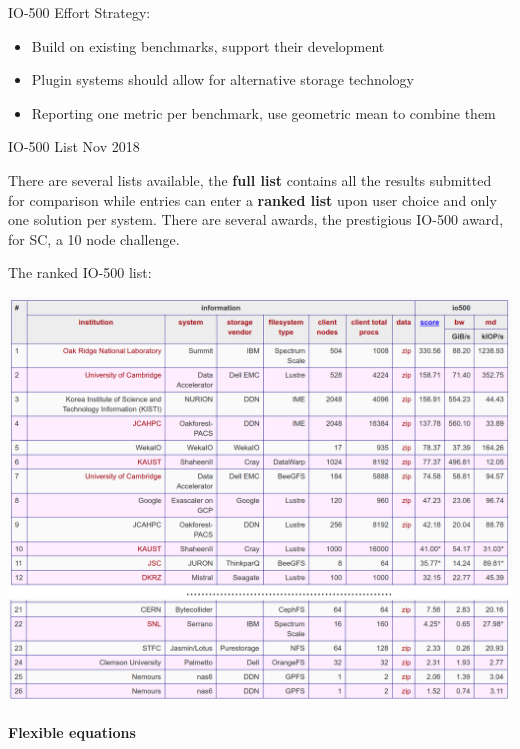 \documentclass[portrait,a0paper,fontscale=0.4]{baposter}
\begin{document}
\begin{poster}
\begin{posterbox}[name=io500,column=1,span=2]{IO-500 Effort}
Strategy:
\vspace*{-1em}
\begin{itemize}
\item Build on existing benchmarks, support their development
\item Plugin systems should allow for alternative storage technology
\item Reporting one metric per benchmark, use geometric mean to combine them
\end{itemize}


\end{posterbox}


\begin{posterbox}[name=io500res,column=1,above=bottom,below=io500]{IO-500 List Nov 2018}

There are several lists available, the \textbf{full list} contains all the results submitted for comparison while entries can enter a \textbf{ranked list} upon user choice and only one solution per system.
There are several awards, the prestigious IO-500 award, for SC, a 10 node challenge.

The ranked IO-500 list:

\includegraphics[width=\textwidth]{io500}


\vspace*{-1em}


\paragraph{Flexible equations}


\end{posterbox}
\end{poster}
\end{document}
